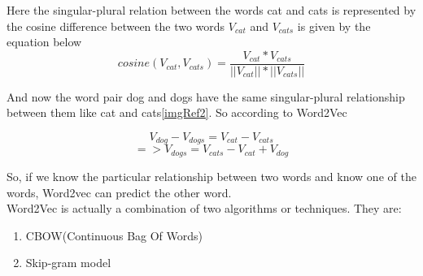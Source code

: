 \documentclass[12pt]{article}
\begin{document}
Here the singular-plural relation between the words cat and cats is represented by the cosine difference between the two words $V_{cat}$ and $V_{cats}$ is given by the equation below\\

$$cosine(V_{cat} , V_{cats}) = \frac{V_{cat}*V_{cats}}{||V_{cat}||*||V_{cats}||}$$ 

And now the word pair dog and dogs have the same singular-plural relationship between them like cat and cats\ref{imgRef2}. So according to Word2Vec


$$V_{dog} - V_{dogs} = V_{cat} - V_{cats}$$
$$=> V_{dogs} = V_{cats} - V_{cat} + V_{dog}$$

So, if we know the particular relationship between two words and know one of the words, Word2vec can predict the other word. \\
Word2Vec is actually a combination of two algorithms or techniques. They are:
\begin{enumerate}
\item CBOW(Continuous Bag Of Words)
\item Skip-gram model
\end{enumerate}
\end{document}
